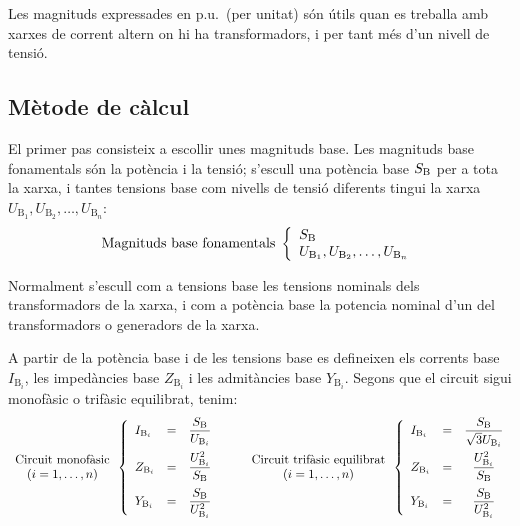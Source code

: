 Les magnituds expressades en p.u.\ (per unitat) s\'{o}n \'{u}tils quan es treballa
amb xarxes de corrent altern on hi ha transformadors, i per tant m\'{e}s d'un nivell de tensi\'{o}.

\subsection{M\`{e}tode de c\`{a}lcul} 

 El primer pas consisteix a
escollir unes magnituds base. Les magnituds base fonamentals s\'{o}n la
pot\`{e}ncia i la tensi\'{o}; s'escull una pot\`{e}ncia base $S_\mathrm{B}$ per a
tota la xarxa, i tantes tensions base com nivells de tensi\'{o}
diferents tingui la xarxa $U_{\text{B}_1}, U_{\text{B}_2}, \ldots,
U_{\text{B}_n}$:
\begin{equation}
   \text{Magnituds base fonamentals}\;\left\{
\begin{array}{l}
   S_\mathrm{B} \\
   U_{\text{B}_1}, U_{\text{B}_2}, \ldots, U_{\text{B}_n}
\end{array}
\right.
\end{equation}

Normalment s'escull com a tensions base les tensions nominals dels transformadors de la
xarxa, i com a pot\`{e}ncia base la potencia nominal d'un del transformadors o generadors de la xarxa.

A partir de la pot\`{e}ncia base i de les tensions base es
defineixen els corrents base $I_{\text{B}_i}$, les imped\`{a}ncies base $Z_{\text{B}_i}$ i les
admit\`{a}ncies base $Y_{\text{B}_i}$. Segons que el circuit sigui monof\`{a}sic o trif\`{a}sic equilibrat, tenim:
\begin{equation}
\begin{array}{c} \text{Circuit monof\`{a}sic} \\ (i=1,\ldots,n) \end{array}
\left\{
\begin{array}{lll}
   I_{\text{B}_i} &= &\dfrac{S_\mathrm{B}}{U_{\text{B}_i}} \\[2.5ex]
   Z_{\text{B}_i} &= &\dfrac{U_{\text{B}_i}^2}{S_\mathrm{B}} \\[2.5ex]
   Y_{\text{B}_i} &= &\dfrac{S_\mathrm{B}}{U_{\text{B}_i}^2}
\end{array}
\right.
\qquad
\begin{array}{c} \text{Circuit trif\`{a}sic equilibrat} \\ (i=1,\ldots,n) \end{array}
\left\{
\begin{array}{llc}
   I_{\text{B}_i} &= &\dfrac{S_\mathrm{B}}{\sqrt{3} U_{\text{B}_i}} \\[2.5ex]
   Z_{\text{B}_i} &= &\dfrac{U_{\text{B}_i}^2}{S_\mathrm{B}} \\[2.5ex]
   Y_{\text{B}_i} &= &\dfrac{S_\mathrm{B}}{U_{\text{B}_i}^2}
\end{array}
\right.
\end{equation}

